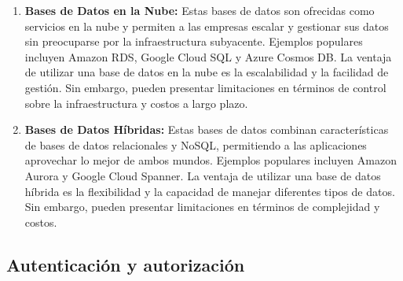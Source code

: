 \begin{enumerate}
    \item \textbf{Bases de Datos en la Nube:} Estas bases de datos son ofrecidas como servicios en la nube y permiten a las empresas escalar y gestionar sus datos sin preocuparse por la infraestructura subyacente. Ejemplos populares incluyen Amazon RDS\cite{amazonrds}, Google Cloud SQL\cite{googlecloudsql} y Azure Cosmos DB\cite{azurecosmosdb}.\newline
        La ventaja de utilizar una base de datos en la nube es la escalabilidad y la facilidad de gestión. Sin embargo, pueden presentar limitaciones en términos de control sobre la infraestructura y costos a largo plazo.

    \item \textbf{Bases de Datos Híbridas:} Estas bases de datos combinan características de bases de datos relacionales y NoSQL, permitiendo a las aplicaciones aprovechar lo mejor de ambos mundos. Ejemplos populares incluyen Amazon Aurora\cite{amazonaurora} y Google Cloud Spanner\cite{cloudspanner}.\newline
        La ventaja de utilizar una base de datos híbrida es la flexibilidad y la capacidad de manejar diferentes tipos de datos. Sin embargo, pueden presentar limitaciones en términos de complejidad y costos.
\end{enumerate}

\subsection{Autenticación y autorización}

